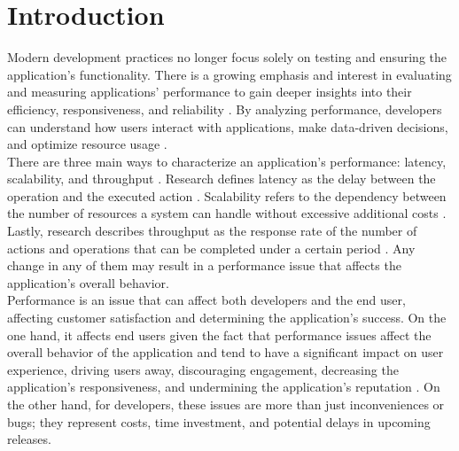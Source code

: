 \section{Introduction}
\label{cha:introduction}

Modern development practices no longer focus solely on testing and ensuring the application's functionality. There is a growing emphasis and interest in evaluating and measuring applications’ performance to gain deeper insights into their efficiency, responsiveness, and reliability \cite{chen2017exploratory, ameller2012software}. By analyzing performance, developers can understand how users interact with applications, make data-driven decisions, and optimize resource usage \cite{chen2017exploratory, bulej2019initial, gunningberg1989application, ameller2012software}. \\ 
There are three main ways to characterize an application’s performance: latency, scalability, and throughput \cite{denaro2004early, laaber2019continuous}. Research defines latency as the delay between the operation and the executed action \cite{dimitrov2000impact, denaro2004early}. Scalability refers to the dependency between the number of resources a system can handle without excessive additional costs \cite{denaro2004early, bondi2000characteristics}. Lastly, research describes throughput as the response rate of the number of actions and operations that can be completed under a certain period \cite{r2006throughput, denaro2004early}. Any change in any of them may result in a performance issue that affects the application’s overall behavior.  \\
Performance is an issue that can affect both developers and the end user, affecting customer satisfaction and determining the application’s success. On the one hand, it affects end users given the fact that performance issues affect the overall behavior of the application and tend to have a significant impact on user experience, driving users away, discouraging engagement, decreasing the application’s responsiveness, and undermining the application’s reputation \cite{grambow, alghamdi2023towards}. On the other hand, for developers, these issues are more than just inconveniences or bugs; they represent costs, time investment, and potential delays in upcoming releases.  \\
